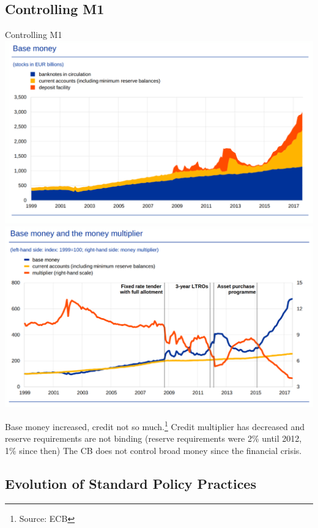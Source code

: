 \documentclass[
  ignorenonframetext,
  aspectratio=169,
]{beamer}
\begin{document}
\subsection{Controlling M1}\label{controlling-m1-1}

\begin{frame}{Controlling M1}
\includegraphics{base_money.png}
\includegraphics{base_money_multiplier.png}

Base money increased, credit not so much.\footnote{Source: ECB} Credit
multiplier has decreased and reserve requirements are not binding
(reserve requirements were 2\% until 2012, 1\% since then) The CB does
not control broad money since the financial crisis.
\end{frame}

\subsection{Evolution of Standard Policy
Practices}\label{evolution-of-standard-policy-practices}
\end{document}

